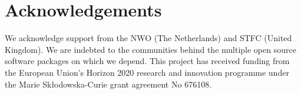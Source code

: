 \section*{Acknowledgements}

\noindent 
We acknowledge support from 
the NWO (The Netherlands) and STFC (United Kingdom).
We are indebted to the communities behind the multiple open 
source software packages on which we depend.
This project has received funding from the European Union’s Horizon 
2020 research and innovation programme under the Marie Skłodowska-Curie 
grant agreement No 676108.
